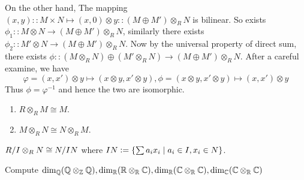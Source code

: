 \begin{itemize}
    On the other hand, The mapping $(x, y) :: M \times N \mapsto (x, 0) \otimes y :: (M \oplus M') \otimes_R N$ 
    is bilinear. So exists $\phi_1 :: M \otimes N \to (M \oplus M') \otimes_R N$, similarly there exists
    $\phi_2 :: M' \otimes N \to (M \oplus M') \otimes_R N$. Now by the universal property of direct sum, 
    there exists $\phi :: (M \otimes_R N)\oplus(M'\otimes_R N) \to (M \oplus M') \otimes_R N$.
    After a careful examine, we have
    \[ \varphi = (x, x') \otimes y \mapsto (x \otimes y, x' \otimes y),
      \phi = (x \otimes y, x' \otimes y) \mapsto (x, x') \otimes y \]
    Thus $\phi = \varphi^{-1}$ and hence the two are isomorphic.
\end{itemize}

\begin{exercise}\mbox{}
  \begin{enumerate}
    \item $R \otimes_R M \cong M$.
    \item $M \otimes_R N \cong N \otimes_R M$.
  \end{enumerate}
\end{exercise}

\begin{exercise}
  ${R}/{I} \otimes_R N \cong {N}/{IN}$ where
  $IN \vcentcolon= \left\{ \sum a_ix_i \mid a_i \in I, x_i \in N \right\}$.
\end{exercise}

\begin{exercise}
  Compute
  $
  \dim_{\mathbb{Q}} (\mathbb{Q} \otimes_{\mathbb{Z}} \mathbb{Q}), 
  \dim_{\mathbb{R}} (\mathbb{R} \otimes_{\mathbb{R}} \mathbb{C}), 
  \dim_{\mathbb{R}} (\mathbb{C} \otimes_{\mathbb{R}} \mathbb{C}), 
  \dim_{\mathbb{C}} (\mathbb{C} \otimes_{\mathbb{R}} \mathbb{C})
  $
\end{exercise}
